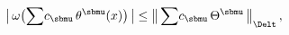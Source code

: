 \begin{equation} \label{6.3}
\big| \, \omega\big({\sum}  c_\sbmu \, \theta^{\sbmu}(x)\big) \, \big|
\leq {\big\| \, {\sum}  c_\sbmu \, \Theta^{\sbmu} \, \big\|}_\Delt
\, ,
\end{equation}

